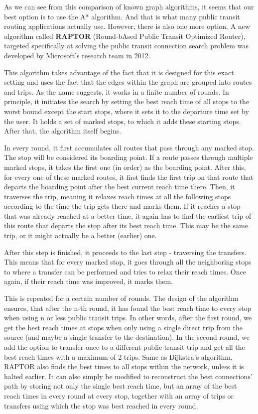 As we can see from this comparison of known graph algorithms, it seems that our best option is to use the A* algorithm. And that is what many public transit routing applications actually use. However, there is also one more option. A new algorithm called \textbf{RAPTOR} (Round-bAsed Public Transit Optimized Router), targeted specifically at solving the public transit connection search problem was developed by Microsoft's research team in 2012\cite{delling2015raptor}.

This algorithm takes advantage of the fact that it is designed for this exact setting and uses the fact that the edges within the graph are grouped into routes and trips. As the name suggests, it works in a finite number of rounds. In principle, it initiates the search by setting the best reach time of all stops to the worst bound except the start stops, where it sets it to the departure time set by the user. It holds a set of marked stops, to which it adds these starting stops. After that, the algorithm itself begins. 

In every round, it first accumulates all routes that pass through any marked stop. The stop will be considered its boarding point. If a route passes through multiple marked stops, it takes the first one (in order) as the boarding point. After this, for every one of these marked routes, it first finds the first trip on that route that departs the boarding point after the best current reach time there. Then, it traverses the trip, meaning it relaxes reach times at all the following stops according to the time the trip gets there and marks them. If it reaches a stop that was already reached at a better time, it again has to find the earliest trip of this route that departs the stop after its best reach time. This may be the same trip, or it might actually be a better (earlier) one.

After this step is finished, it proceeds to the last step - traversing the transfers. This means that for every marked stop, it goes through all the neighboring stops to where a transfer can be performed and tries to relax their reach times. Once again, if their reach time was improved, it marks them.

This is repeated for a certain number of rounds. The design of the algorithm ensures, that after the n-th round, it has found the best reach time to every stop when using n or less public transit trips. In other words, after the first round, we get the best reach times at stops when only using a single direct trip from the source (and maybe a single transfer to the destination). In the second round, we add the option to transfer once to a different public transit trip and get all the best reach times with a maximum of 2 trips. Same as Dijkstra's algorithm, RAPTOR also finds the best times to all stops within the network, unless it is halted earlier. It can also simply be modified to reconstruct the best connections' path by storing not only the single best reach time, but an array of the best reach times in every round at every stop, together with an array of trips or transfers using which the stop was best reached in every round. 

